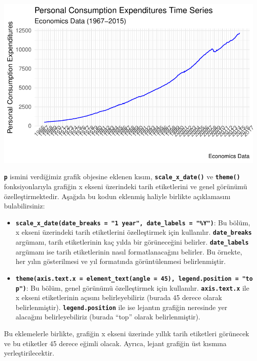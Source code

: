 \documentclass[
  letterpaper,
  DIV=11,
  numbers=noendperiod]{scrreprt}
\begin{document}
\includegraphics{ggplot2_files/figure-pdf/unnamed-chunk-21-1.pdf}

\textbf{\texttt{p}} ismini verdiğimiz grafik objesine eklenen kısım,
\textbf{\texttt{scale\_x\_date()}} ve \textbf{\texttt{theme()}}
fonksiyonlarıyla grafiğin x ekseni üzerindeki tarih etiketlerini ve
genel görünümü özelleştirmektedir. Aşağıda bu kodun eklenmiş haliyle
birlikte açıklamasını bulabilirsiniz:

\begin{itemize}
\item
  \textbf{\texttt{scale\_x\_date(date\_breaks\ =\ "1\ year",\ date\_labels\ =\ "\%Y")}}:
  Bu bölüm, x ekseni üzerindeki tarih etiketlerini özelleştirmek için
  kullanılır. \textbf{\texttt{date\_breaks}} argümanı, tarih
  etiketlerinin kaç yılda bir görüneceğini belirler.
  \textbf{\texttt{date\_labels}} argümanı ise tarih etiketlerinin nasıl
  formatlanacağını belirler. Bu örnekte, her yılın gösterilmesi ve yıl
  formatında görüntülenmesi belirlenmiştir.
\item
  \textbf{\texttt{theme(axis.text.x\ =\ element\_text(angle\ =\ 45),\ legend.position\ =\ "top")}}:
  Bu bölüm, genel görünümü özelleştirmek için kullanılır.
  \textbf{\texttt{axis.text.x}} ile x ekseni etiketlerinin açısını
  belirleyebiliriz (burada 45 derece olarak belirlenmiştir).
  \textbf{\texttt{legend.position}} ile ise lejantın grafiğin neresinde
  yer alacağını belirleyebiliriz (burada ``top'' olarak belirlenmiştir).
\end{itemize}

Bu eklemelerle birlikte, grafiğin x ekseni üzerinde yıllık tarih
etiketleri görünecek ve bu etiketler 45 derece eğimli olacak. Ayrıca,
lejant grafiğin üst kısmına yerleştirilecektir.
\end{document}
